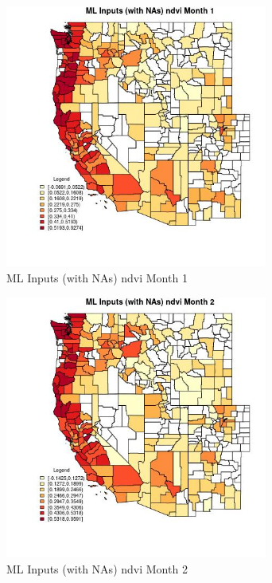\begin{figure} 
\centering  
\includegraphics[width=0.77\textwidth]{Code_Outputs/Report_ML_input_PM25_Step4_part_e_de_duplicated_aves_compiled_2019-05-21wNAs_CountyndvimedianMonth1.jpg} 
\caption{\label{fig:Report_ML_input_PM25_Step4_part_e_de_duplicated_aves_compiled_2019-05-21wNAsCountyndvimedianMonth1}ML Inputs (with NAs) ndvi Month 1} 
\end{figure} 
 

\begin{figure} 
\centering  
\includegraphics[width=0.77\textwidth]{Code_Outputs/Report_ML_input_PM25_Step4_part_e_de_duplicated_aves_compiled_2019-05-21wNAs_CountyndvimedianMonth2.jpg} 
\caption{\label{fig:Report_ML_input_PM25_Step4_part_e_de_duplicated_aves_compiled_2019-05-21wNAsCountyndvimedianMonth2}ML Inputs (with NAs) ndvi Month 2} 
\end{figure} 
 


